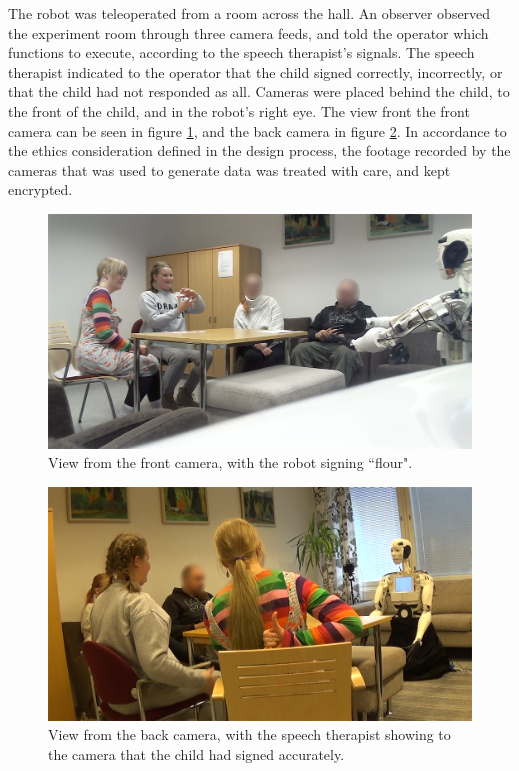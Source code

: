 The robot was teleoperated from a room across the hall. An observer observed the experiment room through three camera feeds, and told the operator which functions to execute, according to the speech therapist's signals. The speech therapist indicated to the operator that the child signed correctly, incorrectly, or that the child had not responded as all. Cameras were placed behind the child, to the front of the child, and in the robot's right eye. The view front the front camera can be seen in figure \ref{fig:front}, and the back camera in figure \ref{fig:back}. In accordance to the ethics consideration defined in the design process, the footage recorded by the cameras that was used to generate data was treated with care, and kept encrypted.

\begin{figure}
\centering
  \includegraphics[width=\linewidth]{images/experiment_front.png}
  \caption{View from the front camera, with the robot signing ``flour".}
  \label{fig:front}
\end{figure}

\begin{figure}
\centering
  \includegraphics[width=\linewidth]{images/experiment_back.png}
  \caption{View from the back camera, with the speech therapist showing to the camera that the child had signed accurately.}
  \label{fig:back}
\end{figure}


